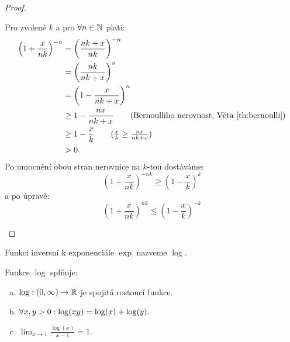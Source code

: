 \begin{proof}
\begin{enumerate}[A.]
\begin{enumerate}[I.]
                    Pro zvolené $k$ a pro $\forall n \in \mathbb{N}$ platí:
                    \begin{align*}
                        \left(1 + \frac{x}{nk}\right)^{-n} 
                            &= \left(\frac{nk+x}{nk}\right)^{-n} \\
                            &= \left(\frac{nk}{nk + x}\right)^n \\
                            &= \left(1 - \frac{x}{nk + x}\right)^n \\
                            &\geq 1 - \frac{nx}{nk + x} \tag{Bernoulliho nerovnost,
                                Věta~\ref{th:bernoulli}} \\
                                &\geq 1 - \frac{x}{k} \tag{$\frac{x}{k} \geq \frac{nx}{nk+x}$} \\
                                &> 0.
                    \end{align*}
                    Po umocnění obou stran nerovnice na $k$-tou dostáváme:
                    $$\left(1 + \frac{x}{nk}\right)^{-nk}
                    \geq \left(1 - \frac{x}{k}\right)^k$$
                    a po úpravě:
                    $$\left(1 + \frac{x}{nk}\right)^{nk} 
                    \leq \left(1 - \frac{x}{k}\right)^{-k}$$
            \end{enumerate}
    \end{enumerate}
\end{proof}

\begin{definition}
    Funkci inversní k exponenciále $\exp$ nazveme  $\log.$
\end{definition}

\begin{theorem}
    Funkce $\log$ splňuje:
    \begin{enumerate}[a)]
        \item $\log: (0, \infty) \rightarrow \mathbb{R}$ je spojitá rostoucí
            funkce.
        \item $\forall x,y > 0: \log(xy) = \log(x) + \log(y).$
        \item $\lim_{x \to 1} \frac{\log(x)}{x - 1} = 1.$
    \end{enumerate}
\end{theorem}

